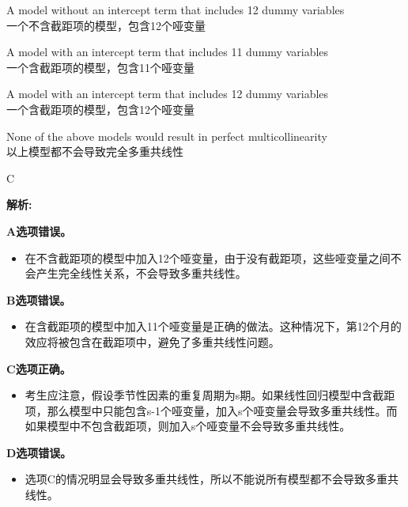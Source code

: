 \documentclass{article}
\newenvironment{explanation}
{\textbf{解析:}\par}
{\par}
\begin{document}
\begin{choices}
    \item A model without an intercept term that includes 12 dummy variables\\
    一个不含截距项的模型，包含12个哑变量
    \item A model with an intercept term that includes 11 dummy variables\\
    一个含截距项的模型，包含11个哑变量
    \item A model with an intercept term that includes 12 dummy variables\\
    一个含截距项的模型，包含12个哑变量
    \item None of the above models would result in perfect multicollinearity\\
    以上模型都不会导致完全多重共线性
\end{choices}

\begin{correctanswer}
C
\end{correctanswer}

\begin{explanation}
\textbf{A选项错误。}
\begin{itemize}
    \item 在不含截距项的模型中加入12个哑变量，由于没有截距项，这些哑变量之间不会产生完全线性关系，不会导致多重共线性。
\end{itemize}

\textbf{B选项错误。}
\begin{itemize}
    \item 在含截距项的模型中加入11个哑变量是正确的做法。这种情况下，第12个月的效应将被包含在截距项中，避免了多重共线性问题。
\end{itemize}

\textbf{C选项正确。}
\begin{itemize}
    \item 考生应注意，假设季节性因素的重复周期为s期。如果线性回归模型中含截距项，那么模型中只能包含s-1个哑变量，加入s个哑变量会导致多重共线性。而如果模型中不包含截距项，则加入s个哑变量不会导致多重共线性。
\end{itemize}

\textbf{D选项错误。}
\begin{itemize}
    \item 选项C的情况明显会导致多重共线性，所以不能说所有模型都不会导致多重共线性。
\end{itemize}
\end{explanation}
\end{document}
